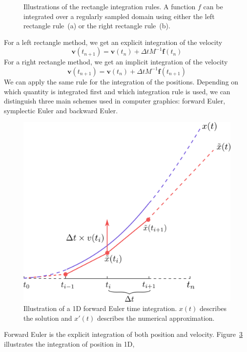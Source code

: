 \begin{figure}[!ht]
\begin{subfigure}[b]{0.46\linewidth}
		\caption{\label{fig:rightRectangleRule}}
	\end{subfigure}
	\caption[STAR mechanics: Rectangle integration rules]{\label{fig:rectangleRules}
		Illustrations of the rectangle integration rules. A function $f$ can be integrated over a regularly sampled domain using either the left rectangle rule~(a) or the right rectangle rule~(b).}
\end{figure}

For a left rectangle method, we get an explicit integration of the velocity
\begin{equation}
\label{eq:explicitIntegration}
\mathbf{v}(t_{n+1}) = \mathbf{v}(t_{n}) + \Delta t M^{-1}\mathbf{f}(t_{n})
\end{equation}
For a right rectangle method, we get an implicit integration of the velocity
\begin{equation}
\label{eq:implicitIntegration}
\mathbf{v}(t_{n+1}) = \mathbf{v}(t_{n}) + \Delta t M^{-1}\mathbf{f}(t_{n+1})
\end{equation}
We can apply the same rule for the integration of the positions.
Depending on which quantity is integrated first and which integration rule is used, we can distinguish three main schemes used in computer graphics: forward Euler, symplectic Euler and backward Euler.
\begin{figure}[!ht]
	\centering
	\includegraphics[width=0.7\linewidth]{images/continuum_mechanics/timeIntegration.png}
	\caption[STAR mechanics: Temporal integration]{\label{fig:timeIntegration} 
		Illustration of a 1D forward Euler time integration. 
		$x(t)$ describes the solution and $x'(t)$ describes the numerical approximation.}
\end{figure}
Forward Euler is the explicit integration of both position and velocity.
Figure~\ref{fig:timeIntegration} illustrates the integration of position in 1D,
